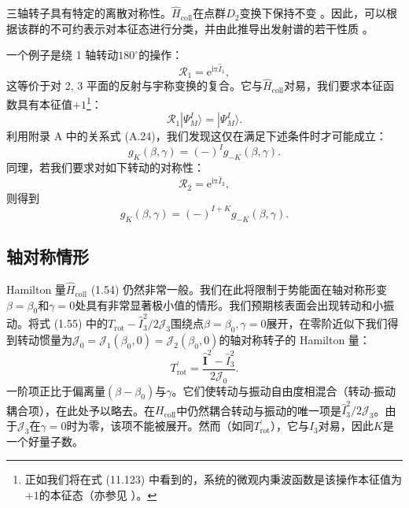 三轴转子具有特定的离散对称性。$\hat{H}_{\text{coll}}$在点群$D_{2}$变换下保持不变 \cite{Bo52}。因此，可以根据该群的不可约表示对本征态进行分类，并由此推导出发射谱的若干性质
\cite{Da68}。

一个例子是绕 1 轴转动$180^{\circ}$的操作：
\begin{equation}
\mathscr{R}_{1}=\mathrm{e}^{\mathrm{i}\mathrm{\pi}\hat{I}_{1}},\label{eq:1.57}
\end{equation}
这等价于对 2, 3 平面的反射与宇称变换的复合。它与$\hat{H}_{\text{coll}}$对易，我们要求本征函数具有本征值$+1$\footnote{正如我们将在式 (11.123) 中看到的，系统的微观内秉波函数是该操作本征值为$+1$的本征态（亦参见 \cite{Bo76b}）。}：
\begin{equation}
\mathscr{R}_{1}|\Psi^{I}_{M}\rangle=|\Psi^{I}_{M}\rangle.\label{eq:1.58}
\end{equation}
利用附录 A 中的关系式 (A.24)，我们发现这仅在满足下述条件时才可能成立：
\begin{equation}
g_{K}(\beta,\gamma)=(-)^{I}g_{-K}(\beta,\gamma).\label{eq:1.59}
\end{equation}
同理，若我们要求对如下转动的对称性：
\begin{equation}
\mathscr{R}_{2}=\mathrm{e}^{\mathrm{i}\mathrm{\pi}\hat{I}_{2}},\label{eq:1.60}
\end{equation}
则得到
\begin{equation}
g_{K}(\beta,\gamma)=(-)^{I+K}g_{-K}(\beta,\gamma).\label{eq:1.61}
\end{equation}


\subsection{轴对称情形\label{subsec:=008F74=005BF9=0079F0=0060C5=005F62}}

Hamilton 量$\hat{H}_{\text{coll}}$ (1.54) 仍然非常一般。我们在此将限制于势能面在轴对称形变$\beta=\beta_{0}$和$\gamma=0$处具有非常显著极小值的情形。我们预期核表面会出现转动和小振动。将式
(1.55) 中的$T_{\text{rot}}-\hat{I}^{2}_{3}/2\mathcal{J}_{3}$围绕点$\beta=\beta_{0},\gamma=0$展开，在零阶近似下我们得到转动惯量为$\mathcal{J}_{0}=\mathcal{J}_{1}(\beta_{0},0)=\mathcal{J}_{2}(\beta_{0},0)$的轴对称转子的
Hamilton 量：
\begin{equation}
T^{\prime}_{\text{rot}}=\frac{\hat{\boldsymbol{I}}^{2}-\hat{I}^{2}_{3}}{2\mathcal{J}_{0}}.\label{eq:1.62}
\end{equation}
一阶项正比于偏离量$(\beta-\beta_{0})$与$\gamma$。它们使转动与振动自由度相混合（转动-振动耦合项），在此处予以略去。在$H_{\text{coll}}$中仍然耦合转动与振动的唯一项是$\hat{I}^{2}_{3}/2\mathcal{J}_{3}$。由于$\mathcal{J}_{3}$在$\gamma=0$时为零，该项不能被展开。然而（如同$T^{\prime}_{\text{rot}}$），它与$\hat{I}_{3}$对易，因此$K$是一个好量子数。

